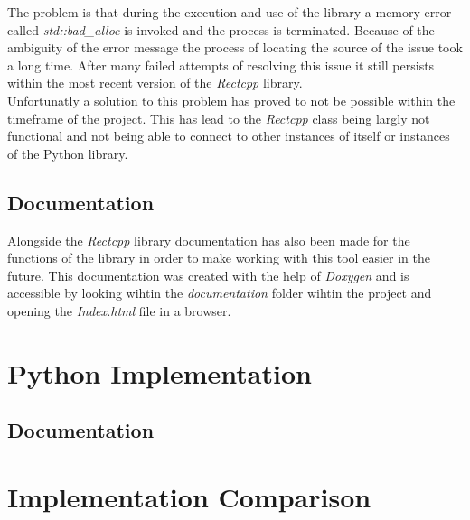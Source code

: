 The problem is that during the execution and use of the library a memory error called \textit{std::bad\_alloc} is invoked and the process is terminated. Because of 
the ambiguity of the error message the process of locating the source of the issue took a long time. After many failed attempts of resolving this issue it still
persists within the most recent version of the \textit{Rectcpp} library.\\

Unfortunatly a solution to this problem has proved to not be possible within the timeframe of the project. This has lead to the \textit{Rectcpp} class being 
largly not functional and not being able to connect to other instances of itself or instances of the Python library.

\subsection{Documentation}
Alongside the \textit{Rectcpp} library documentation has also been made for the functions of the library in order to make working with this tool easier in the future.
This documentation was created with the help of \textit{Doxygen} and is accessible by looking wihtin the \textit{documentation} folder wihtin the project and opening
the \textit{Index.html} file in a browser. 


\section{Python Implementation}

\subsection{Documentation}

\section{Implementation Comparison}

\filbreak
